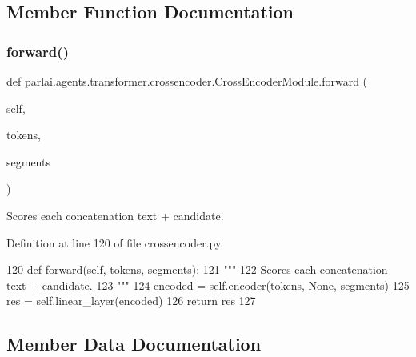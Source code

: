 \subsection{Member Function Documentation}
\mbox{\label{classparlai_1_1agents_1_1transformer_1_1crossencoder_1_1CrossEncoderModule_a86a9cf18bddebb5a1ee9c4096cfe7c20}} 
\subsubsection{\texorpdfstring{forward()}{forward()}}
{\footnotesize\ttfamily def parlai.\+agents.\+transformer.\+crossencoder.\+Cross\+Encoder\+Module.\+forward (\begin{DoxyParamCaption}\item[{}]{self,  }\item[{}]{tokens,  }\item[{}]{segments }\end{DoxyParamCaption})}

\begin{DoxyVerb}Scores each concatenation text + candidate.
\end{DoxyVerb}
 

Definition at line 120 of file crossencoder.\+py.


\begin{DoxyCode}
120     \textcolor{keyword}{def }forward(self, tokens, segments):
121         \textcolor{stringliteral}{"""}
122 \textcolor{stringliteral}{        Scores each concatenation text + candidate.}
123 \textcolor{stringliteral}{        """}
124         encoded = self.encoder(tokens, \textcolor{keywordtype}{None}, segments)
125         res = self.linear\_layer(encoded)
126         \textcolor{keywordflow}{return} res
127 \end{DoxyCode}


\subsection{Member Data Documentation}
\mbox{\label{classparlai_1_1agents_1_1transformer_1_1crossencoder_1_1CrossEncoderModule_a7b3493099f48331b36c465cc393b5145}} 
